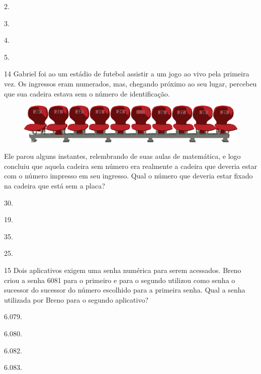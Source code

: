 \begin{multicols}{2}
\begin{escolha}
\item
  2.
\item
  3.
\item
  4.
\item
  5.
\end{escolha}
\end{multicols}

\pagebreak
\num{14} Gabriel foi ao um estádio de futebol assistir a um jogo ao vivo pela primeira vez. Os ingressos eram numerados, mas, chegando próximo ao seu
lugar, percebeu que sua cadeira estava sem o número de identificação.

\begin{figure}[htpb!]
\centering
\includegraphics[width=\textwidth]{./media/image107.png}
\end{figure}

Ele parou alguns instantes, relembrando de suas aulas de matemática, e logo concluiu que aquela cadeira sem número era realmente a cadeira que deveria estar com o número impresso em seu ingresso. Qual o número que
deveria estar fixado na cadeira que está sem a placa?

\begin{escolha}
\item
  30.
\item
  19.
\item
  35.
\item
  25.
\end{escolha}

\num{15} Dois aplicativos exigem uma senha numérica para serem acessados. Breno criou a senha 6081 para o primeiro e para o segundo utilizou como senha o sucessor do sucessor do número escolhido para a primeira senha. Qual a senha utilizada por Breno para o segundo aplicativo?

\begin{escolha}
\item
  6.079.
\item
  6.080.
\item
  6.082.
\item
  6.083.
\end{escolha}

